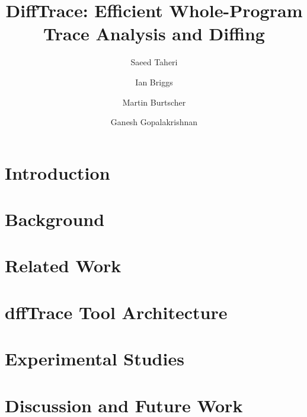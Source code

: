 \documentclass[sigconf]{acmart}
\begin{document}
\title{ DiffTrace: Efficient Whole-Program Trace Analysis and Diffing}


\author{Saeed Taheri}

\author{Ian Briggs}

\author{Martin Burtscher}

\author{Ganesh Gopalakrishnan}






\begin{abstract}
\label{abs}

\end{abstract}


\maketitle


\section{Introduction}
\label{sec:intro}


\clearpage

\section{Background}
\label{sec:background}


\clearpage

\section{Related Work}
\label{sec:related}


\clearpage

\section{dffTrace Tool Architecture}
\label{sec:components}


\clearpage

\section{Experimental Studies}
\label{sec:experimental}



\clearpage

    
\section{Discussion and Future Work}
\label{sec:discussion}


\clearpage




\end{document}
